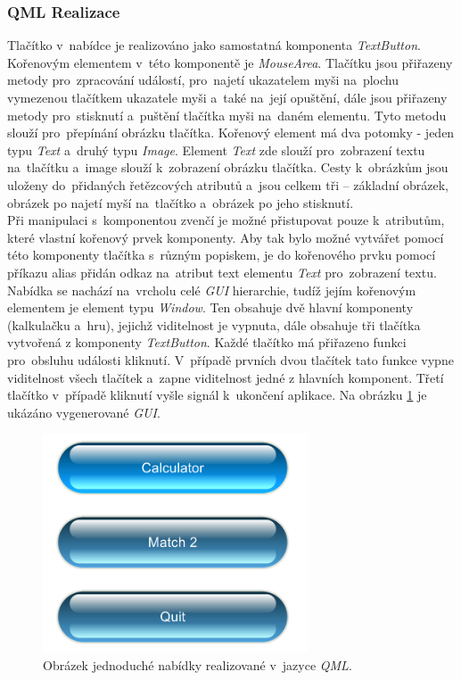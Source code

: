 \documentclass[11pt,twoside,a4paper]{book}
\begin{document}
\subsubsection{QML Realizace}
Tlačítko v~nabídce je realizováno jako samostatná komponenta \textit{TextButton}.  Kořenovým elementem v~této komponentě je \textit{MouseArea}. Tlačítku jsou přiřazeny metody pro~zpracování událostí, pro~najetí ukazatelem myši na~plochu vymezenou tlačítkem ukazatele myši a~také na~její opuštění, dále jsou přiřazeny metody pro~stisknutí a~puštění tlačítka myši na~daném elementu. Tyto metodu slouží pro~přepínání obrázku tlačítka. Kořenový element má dva potomky - jeden typu \textit{Text} a~druhý typu \textit{Image}. Element \textit{Text} zde slouží pro~zobrazení textu na~tlačítku a~image slouží k~zobrazení obrázku tlačítka. Cesty k~obrázkům jsou uloženy do~přidaných řetězcových atributů a~jsou celkem tři – základní obrázek, obrázek po najetí myší na~tlačítko a~obrázek po jeho stisknutí. \\
Při manipulaci s~komponentou zvenčí je možné přistupovat pouze k~atributům, které vlastní kořenový prvek komponenty. Aby tak bylo možné vytvářet pomocí této komponenty tlačítka s~různým popiskem, je do kořenového prvku pomocí příkazu alias přidán odkaz na~atribut text elementu \textit{Text} pro~zobrazení textu.
Nabídka se nachází na~vrcholu celé \textit{GUI} hierarchie, tudíž jejím kořenovým elementem je element typu \textit{Window}. Ten obsahuje dvě hlavní komponenty (kalkulačku a~hru), jejichž viditelnost je vypnuta, dále obsahuje tři tlačítka vytvořená z komponenty \textit{TextButton}. Každé tlačítko má přiřazeno funkci pro~obsluhu události kliknutí. V~případě prvních dvou tlačítek tato funkce vypne viditelnost všech tlačítek a~zapne viditelnost jedné z hlavních komponent. Třetí tlačítko v~případě kliknutí vyšle signál k~ukončení aplikace. Na obrázku \ref{fig:outMenuQML} je ukázáno vygenerované \textit{GUI}.
\begin{figure}[!ht]
\begin{center}
  \includegraphics[width=0.7\textwidth]{qmlMenu}
\caption{{\label{fig:outMenuQML}}Obrázek jednoduché nabídky realizované v~jazyce \textit{QML}.}
\end{center}
\end{figure}
\end{document}
